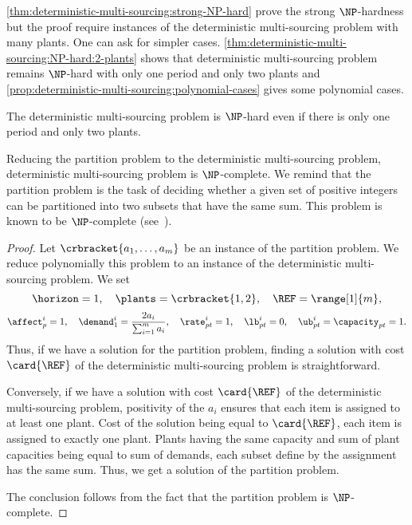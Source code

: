\cref{thm:deterministic-multi-sourcing:strong-NP-hard} prove the strong $\NP$-hardness but the proof require instances of the deterministic multi-sourcing problem with many plants.
One can ask for simpler cases.
\cref{thm:deterministic-multi-sourcing:NP-hard:2-plants} shows that deterministic multi-sourcing problem remains $\NP$-hard with only one period and only two plants and \cref{prop:deterministic-multi-sourcing:polynomial-cases} gives some polynomial cases.


\begin{prop}\label{thm:deterministic-multi-sourcing:NP-hard:2-plants}
The deterministic multi-sourcing problem is $\NP$-hard even if there is only one period and only two plants.
\end{prop}


Reducing the partition problem to the deterministic multi-sourcing problem, deterministic multi-sourcing problem is $\NP$-complete.
We remind that the partition problem is the task of deciding whether a given set of positive integers can be partitioned into two subsets that have the same sum.
This problem is known to be $\NP$-complete (see~\cite{Garey1979}).


\begin{proof}
Let $\crbracket{a_1,\ldots,a_m}$ be an instance of the partition problem.
We reduce polynomially this problem to an instance of the deterministic multi-sourcing problem.
We set
$$
  \horizon=1
  ,\quad
  \plants=\crbracket{1,2}
  ,\quad
  \REF=\range[1]{m},
$$
$$
  \affect_p^i=1
  ,\quad
  \demand_1^i=\frac{2a_i}{\sum_{i=1}^{m}a_i}
  ,\quad
  \rate_{pt}^i=1
  ,\quad
  \lb_{pt}^i=0
  ,\quad
  \ub_{pt}^i=\capacity_{pt}=1.
$$
Thus, if we have a solution for the partition problem, finding a solution with cost $\card{\REF}$ of the deterministic multi-sourcing problem is straightforward.

Conversely, if we have a solution with cost $\card{\REF}$ of the deterministic multi-sourcing problem, positivity of the $a_i$ ensures that each item is assigned to at least one plant.
Cost of the solution being equal to $\card{\REF}$, each item is assigned to exactly one plant.
Plants having the same capacity and sum of plant capacities being equal to sum of demands, each subset define by the assignment has the same sum.
Thus, we get a solution of the partition problem.

The conclusion follows from the fact that the partition problem is $\NP$-complete.
\end{proof}


